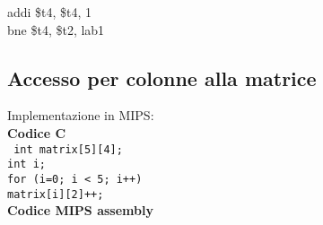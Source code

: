 \documentclass[../main.tex]{subfiles}
\begin{document}
{    \hspace*{4mm} \hspace*{0cm} \hspace*{0cm} \hspace*{0cm} \hspace*{0cm} addi \$t4, \$t4, 1 \\
    \hspace*{4mm} \hspace*{0cm} \hspace*{0cm} \hspace*{0cm} \hspace*{0cm} bne \$t4, \$t2, lab1
}

\newpage

\subsection{Accesso per colonne alla matrice}
Implementazione in MIPS:
\\[5mm]
\hspace*{5mm} \textbf{Codice C} \\
\texttt{
    \hspace*{4mm} int matrix[5][4]; \\
    \hspace*{4mm} int i; \\
    \hspace*{4mm} for (i=0; i < 5; i++) \\
    \hspace*{4mm} \hspace*{0cm} \hspace*{0cm} \hspace*{0cm} \hspace*{0cm} matrix[i][2]++; \\[3mm]
}
\hspace*{5mm} \textbf{Codice MIPS assembly} \\
\end{document}
